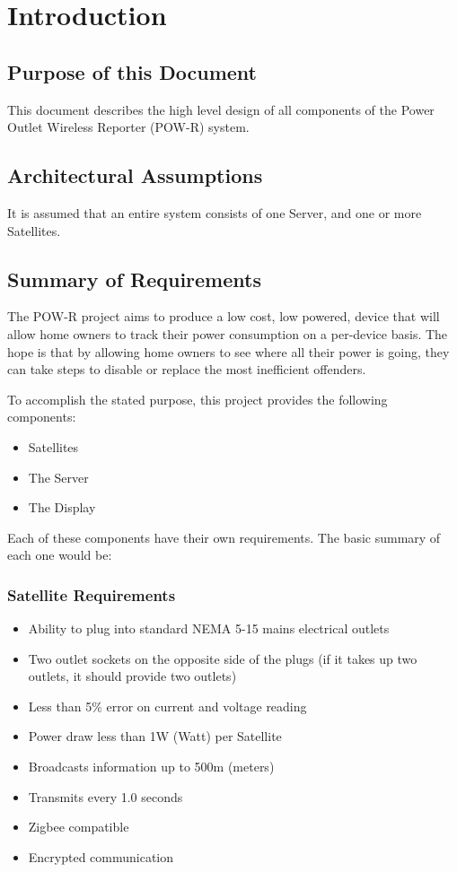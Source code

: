 \chapter{Introduction}

\section{Purpose of this Document}
This document describes the high level design of all components of the Power Outlet Wireless Reporter (POW-R) system.

\section{Architectural Assumptions}
It is assumed that an entire system consists of one Server, and one or more Satellites.

\section{Summary of Requirements}
The POW-R project aims to produce a low cost, low powered, device that will allow home owners to track their power consumption on a per-device basis. 
The hope is that by allowing home owners to see where all their power is going, they can take steps to disable or replace the most inefficient offenders.

To accomplish the stated purpose, this project provides the following components:
\begin{itemize}
 \item Satellites
 \item The Server
 \item The Display
\end{itemize}

Each of these components have their own requirements. The basic summary of each one would be:

\subsection{Satellite Requirements}
\begin{itemize}
 \item Ability to plug into standard NEMA 5-15 mains electrical outlets
 \item Two outlet sockets on the opposite side of the plugs (if it takes up two outlets, it should provide two outlets)
 \item Less than 5\% error on current and voltage reading
 \item Power draw less than 1W (Watt) per Satellite
 \item Broadcasts information up to 500m (meters)
 \item Transmits every 1.0 seconds
 \item Zigbee compatible
 \item Encrypted communication
\end{itemize}

